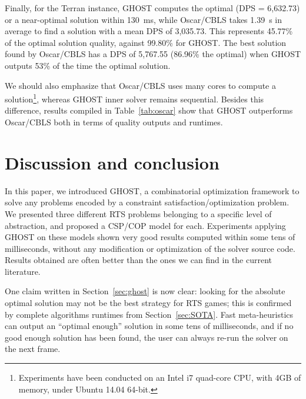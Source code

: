 \documentclass[journal]{IEEEtran}
\newcommand{\csp}{\textsc{CSP}\xspace}
\newcommand{\cop}{\textsc{COP}\xspace}
\newcommand{\ghost}{\textsc{GHOST}\xspace}
\begin{document}
Finally, for  the Terran instance,  \ghost computes the optimal  (DPS =
6,632.73) or  a near-optimal  solution within 130~ms,  while Oscar/CBLS
takes 1.39~s in average to find a solution with a mean DPS of 3,035.73.
This  represents  45.77\% of  the  optimal  solution quality,  against
99.80\% for \ghost. The best solution found by Oscar/CBLS has a DPS of
5,767.55 (86.96\%  the optimal) when  \ghost outputs 53\% of  the time
the optimal solution.

We should also emphasize that Oscar/CBLS uses many cores to compute a solution\footnote{Experiments have been conducted on an Intel i7 quad-core CPU, with 4GB of memory, under Ubuntu 14.04 64-bit.}, whereas \ghost inner solver remains sequential. Besides this difference, results compiled in Table~\ref{tab:oscar} show that \ghost outperforms Oscar/CBLS both in terms of quality outputs and runtimes.



\section{Discussion and conclusion}\label{sec:conclusion}

In  this paper,  we  introduced \ghost,  a combinatorial  optimization
framework   to    solve   any   problems   encoded    by   a   constraint
satisfaction/optimization problem.   We presented three  different RTS
problems belonging to a specific  level of abstraction, and proposed a
\csp/\cop model for each. Experiments  applying \ghost on these models
shown very  good results  computed within  some tens  of milliseconds,
without  any  modification  or   optimization  of  the  solver  source
code. Results obtained  are often better than the ones  we can find in
the current literature.

One claim written in Section~\ref{sec:ghost} is now clear: looking for
the absolute  optimal solution may  not be  the best strategy  for RTS
games; this is confirmed by complete algorithms runtimes from Section~\ref{sec:SOTA}.  Fast  meta-heuristics  can  output an  ``optimal
enough'' solution in some tens of  milliseconds, and if no good enough
solution has been found, the user can always re-run the solver on the
next frame.   %

\end{document}
